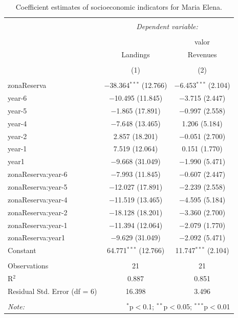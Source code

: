 \documentclass[utf8]{frontiers_suppmat} %
\begin{document}
\begin{table}[!htbp] \centering 
  \caption{Coefficient estimates of socioeconomic indicators for Maria Elena.} 
  \label{} 
\tiny 
\begin{tabular}{@{\extracolsep{1pt}}lcc} 
\\[-1.8ex]\hline 
\hline \\[-1.8ex] 
 & \multicolumn{2}{c}{\textit{Dependent variable:}} \\ 
\cline{2-3} 
\\[-1.8ex] &  & valor \\ 
 & Landings & Revenues \\ 
\\[-1.8ex] & (1) & (2)\\ 
\hline \\[-1.8ex] 
 zonaReserva & $-$38.364$^{***}$ (12.766) & $-$6.453$^{***}$ (2.104) \\ 
  year-6 & $-$10.495 (11.845) & $-$3.715 (2.447) \\ 
  year-5 & $-$1.865 (17.891) & $-$0.997 (2.558) \\ 
  year-4 & $-$7.648 (13.465) & 1.206 (5.184) \\ 
  year-2 & 2.857 (18.201) & $-$0.051 (2.700) \\ 
  year-1 & 7.519 (12.064) & 0.151 (1.770) \\ 
  year1 & $-$9.668 (31.049) & $-$1.990 (5.471) \\ 
  zonaReserva:year-6 & $-$7.993 (11.845) & $-$0.607 (2.447) \\ 
  zonaReserva:year-5 & $-$12.027 (17.891) & $-$2.239 (2.558) \\ 
  zonaReserva:year-4 & $-$11.519 (13.465) & $-$4.595 (5.184) \\ 
  zonaReserva:year-2 & $-$18.128 (18.201) & $-$3.360 (2.700) \\ 
  zonaReserva:year-1 & $-$11.394 (12.064) & $-$2.079 (1.770) \\ 
  zonaReserva:year1 & $-$9.629 (31.049) & $-$2.092 (5.471) \\ 
  Constant & 64.771$^{***}$ (12.766) & 11.747$^{***}$ (2.104) \\ 
 \hline \\[-1.8ex] 
Observations & 21 & 21 \\ 
R$^{2}$ & 0.887 & 0.851 \\ 
Residual Std. Error (df = 6) & 16.398 & 3.496 \\ 
\hline 
\hline \\[-1.8ex] 
\textit{Note:}  & \multicolumn{2}{r}{$^{*}$p$<$0.1; $^{**}$p$<$0.05; $^{***}$p$<$0.01} \\ 
\end{tabular} 
\end{table}
\end{document}
